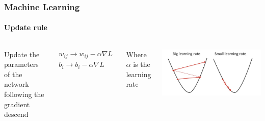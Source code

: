 \documentclass[aspectratio=43]{beamer}
\begin{document}
\begin{frame}

	\frametitle{Machine Learning}
	\framesubtitle{Update rule}
	
	\begin{columns}
		
		
		Update the parameters of the network following the gradient descend
		
		\begin{align}
			w_{ij} \longrightarrow w_{ij} - \alpha \nabla L \nonumber \\
			b_{i} \longrightarrow b_{i} - \alpha \nabla L  \nonumber
		\end{align}
		
		Where $\alpha$ is the learning rate
		
		
		\includegraphics[width = 1.25 \linewidth]{plots/loss2.png}
		
	\end{columns}

\end{frame}

\begin{frame}


\end{frame}
\end{document}
